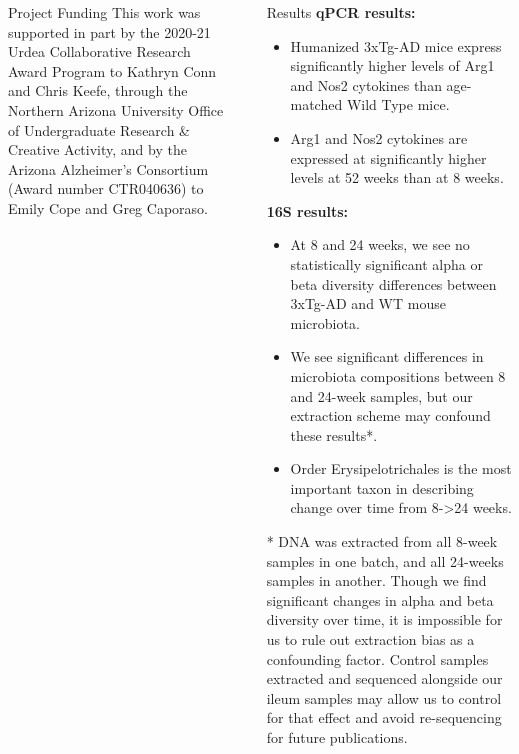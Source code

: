\documentclass[final]{beamer}
\newlength{\sepwidth}
\newlength{\colwidth}
\newcommand{\separatorcolumn}{\begin{column}{\sepwidth}\end{column}}
\begin{document}
\begin{frame}[t]
\begin{columns}[t]
\begin{column}{\colwidth}
  \begin{block}{Project Funding}
    This work was supported in part by the 2020-21 Urdea Collaborative
    Research Award Program to Kathryn Conn and Chris Keefe, through the
    Northern Arizona University Office of Undergraduate Research \& Creative
    Activity, and by the Arizona Alzheimer’s Consortium (Award number
    CTR040636) to Emily Cope and Greg Caporaso.
  \end{block}

\end{column}

\separatorcolumn

\begin{column}{\colwidth}
    \begin{block}{Results}
      \textbf{qPCR results:}
      \begin{itemize}
        \item Humanized 3xTg-AD mice express significantly higher levels of Arg1 and Nos2 cytokines than age-matched Wild Type mice.
        \item Arg1 and Nos2 cytokines are expressed at significantly higher levels at 52 weeks than at 8 weeks.
      \end{itemize}

      \textbf{16S results:}
      \begin{itemize}
      \item At 8 and 24 weeks, we see no statistically significant alpha or beta diversity differences between 3xTg-AD and WT mouse microbiota.
      \item We see significant differences in microbiota compositions between 8 and 24-week samples, but our extraction scheme may confound these results*.
      \item Order Erysipelotrichales is the most important taxon in describing change over time from 8->24 weeks.
      \end{itemize}

    \begin{tcolorbox}
    [width=\textwidth, colframe=blue]
      * DNA was extracted from all 8-week samples in one batch, and all
      24-weeks samples in another. Though we find significant changes in
      alpha and beta diversity over time, it is impossible for us to rule out
      extraction bias as a confounding factor. Control samples extracted
      and sequenced alongside our ileum samples may allow us to control for 
      that effect and avoid re-sequencing for future publications. 
    \end{tcolorbox}


\end{block}
\end{column}
\end{columns}
\end{frame}
\end{document}

